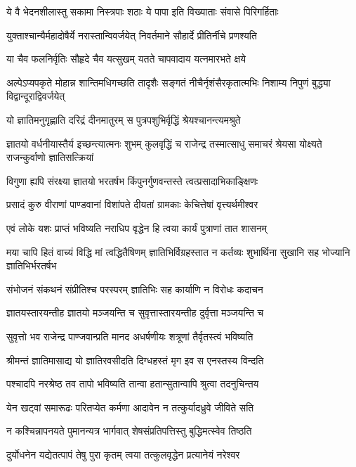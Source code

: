 \twolineshloka
{ये वै भेदनशीलास्तु सकामा निस्त्रपाः शठाः}
{ये पापा इति विख्याताः संवासे पिरिगर्हिताः}


\twolineshloka
{युक्ताश्चान्यैर्महादोषैर्ये नरास्तान्विवर्जयेत्}
{निवर्तमाने सौहार्दे प्रीतिर्नीचे प्रणश्यति}


\twolineshloka
{या चैव फलनिर्वृतिः सौहृदे चैव यत्सुखम्}
{यतते चापवादाय यत्नमारभते क्षये}


\threelineshloka
{अल्पेऽप्यपकृते मोहान्न शान्तिमधिगच्छति}
{तादृशैः सङ्गतं नीचैर्नृशंसैरकृतात्मभिः}
{निशाम्य निपुणं बुद्ध्या विद्वान्दूराद्विवर्जयेत्}


\twolineshloka
{यो ज्ञातिमनुगृह्णाति दरिद्रं दीनमातुरम्}
{स पुत्रपशुभिर्वृद्धिं श्रेयश्चानन्त्यमश्रुते}


ज्ञातयो वर्धनीयास्तैर्य इच्छन्त्यात्मनः शुभम्
\twolineshloka
{कुलवृद्धिं च राजेन्द्र तस्मात्साधु समाचरं}
{श्रेयसा योक्ष्यते राजन्कुर्वाणो ज्ञातिसत्क्रियां}


\twolineshloka
{विगुणा ह्यपि संरक्ष्या ज्ञातयो भरतर्षभ}
{किंपुनर्गुणवन्तस्ते त्वत्प्रसादाभिकाङ्क्षिणः}


\twolineshloka
{प्रसादं कुरु वीराणां पाण्डवानां विशांपते}
{दीयतां ग्रामकाः केचित्तेषां वृत्त्यर्थमीश्वर}


\twolineshloka
{एवं लोके यशः प्राप्तं भविष्यति नराधिप}
{वृद्धेन हि त्वया कार्यं पुत्राणां तात शासनम्}


\threelineshloka
{मया चापि हितं वाच्यं विद्धि मां त्वद्धितैषिणम्}
{ज्ञातिभिर्विग्रहस्तात न कर्तव्यः शुभार्थिना}
{सुखानि सह भोज्यानि ज्ञातिभिर्भरतर्षभ}


\twolineshloka
{संभोजनं संकथनं संप्रीतिश्च परस्परम्}
{ज्ञातिभिः सह कार्याणि न विरोधः कदाचन}


\twolineshloka
{ज्ञातयस्तारयन्तीह ज्ञातयो मञ्जयन्ति च}
{सुवृत्तास्तारयन्तीह दुर्वृत्ता मञ्जयन्ति च}


\twolineshloka
{सुवृत्तो भव राजेन्द्र पाण्जवान्प्रति मानद}
{अधर्षणीयः शत्रूणां तैर्वृतस्त्वं भविष्यति}


\twolineshloka
{श्रीमन्तं ज्ञातिमासाद्य यो ज्ञातिरवसीदति}
{दिग्धहस्तं मृग इव स एनस्तस्य विन्दति}


\twolineshloka
{पश्चादपि नरश्रेष्ठ तव तापो भविष्यति}
{तान्वा हतान्सुतान्वापि श्रुत्वा तदनुचिन्तय}


\twolineshloka
{येन खट्वां समारूढः परितप्येत कर्मणा}
{आदावेन न तत्कुर्यादध्रुवे जीविते सति}


\twolineshloka
{न कश्चिन्नापनयते पुमानन्यत्र भार्गवात्}
{शेषसंप्रतिपत्तिस्तु बुद्धिमत्स्वेव तिष्ठति}


\twolineshloka
{दुर्योधनेन यद्येतत्पापं तेषु पुरा कृतम्}
{त्वया तत्कुलवृद्धेन प्रत्यानेयं नरेश्वर}


